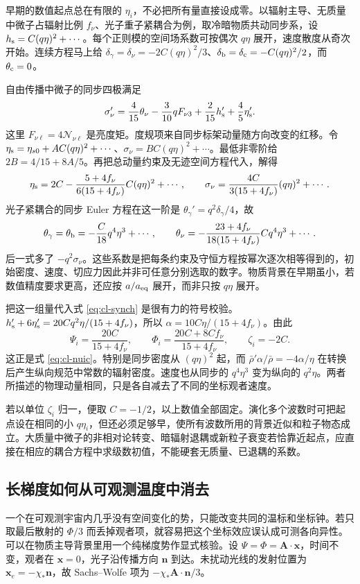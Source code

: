 早期的数值起点总在有限的 $\eta_i$，不必把所有量直接设成零。以辐射主导、无质量中微子占辐射比例 $f_\nu$、光子重子紧耦合为例，取冷暗物质共动同步系，设 $h_{\rm s}=C(q\eta)^2+\cdots$。每个正则模的空间场系数可按偶次 $q\eta$ 展开，速度散度从奇次开始。连续方程马上给 $\delta_\gamma=\delta_\nu=-2C(q\eta)^2/3$、$\delta_{\rm b}=\delta_{\rm c}=-C(q\eta)^2/2$，而 $\theta_{\rm c}=0$。

自由传播中微子的同步四极满足
\[
 \sigma_\nu'=\frac{4}{15}\theta_\nu-\frac{3}{10}q F_{\nu3}
                 +\frac{2}{15}h_{\rm s}'+\frac45\eta_{\rm s}' .
\]
这里 $F_{\nu\ell}=4\mathcal N_{\nu\ell}$ 是亮度矩。度规项来自同步标架动量随方向改变的红移。令 $\eta_{\rm s}=\eta_{s0}+A C(q\eta)^2+\cdots$、$\sigma_\nu=B C(q\eta)^2+\cdots$。最低非零阶给 $2B=4/15+8A/5$。再把总动量约束及无迹空间方程代入，解得
\[
 \eta_{\rm s}=2C-
       \frac{5+4f_\nu}{6(15+4f_\nu)}C(q\eta)^2+\cdots,\qquad
 \sigma_\nu=\frac{4C}{3(15+4f_\nu)}(q\eta)^2+\cdots .
\]
光子紧耦合的同步 Euler 方程在这一阶是 $\theta_\gamma'=q^2\delta_\gamma/4$，故
\[
 \theta_\gamma=\theta_{\rm b}=-\frac{C}{18}q^4\eta^3+\cdots,\qquad
 \theta_\nu=-\frac{23+4f_\nu}{18(15+4f_\nu)}Cq^4\eta^3+\cdots .
\]
后一式多了 $-q^2\sigma_\nu$。这些系数是把每条约束及守恒方程按幂次逐次相等得到的，初始密度、速度、切应力因此并非可任意分别选取的数字。物质背景在早期虽小，若数值精度要求更高，还应按 $a/a_{\rm eq}$ 展开，而非只按 $q\eta$ 展开。

把这一组量代入式 \eqref{eq:cl-synch} 是很有力的符号校验。$h_{\rm s}'+6\eta_{\rm s}'=20Cq^2\eta/(15+4f_\nu)$，所以 $\alpha=10C\eta/(15+4f_\nu)$。由此
\[
 \Psi_i=\frac{20C}{15+4f_\nu},\qquad
 \Phi_i=\frac{20C+8Cf_\nu}{15+4f_\nu},\qquad
 \zeta_i=-2C .
\]
这正是式 \eqref{eq:cl-nuic}。特别是同步密度从 $(q\eta)^2$ 起，而 $\bar\rho'\alpha/\bar\rho=-4\alpha/\eta$ 在转换后产生纵向规范中常数的辐射密度。速度也从同步的 $q^4\eta^3$ 变为纵向的 $q^2\eta$。两者所描述的物理动量相同，只是各自减去了不同的坐标观者速度。

若以单位 $\zeta_i$ 归一，便取 $C=-1/2$，以上数值全部固定。演化多个波数时可把起点设在相同的小 $q\eta_i$，但还必须足够早，使所有波数所用的背景近似和粒子物态成立。大质量中微子的非相对论转变、暗辐射退耦或新粒子衰变若恰靠近起点，应直接在相应的耦合方程中求级数初值，不能硬套无质量、已退耦的系数。

\subsection{长梯度如何从可观测温度中消去}

一个在可观测宇宙内几乎没有空间变化的势，只能改变共同的温标和坐标钟。若只取最后散射的 $\Phi/3$ 而丢掉观者项，就容易把这个坐标效应误认成可测各向异性。可以在物质主导背景里用一个纯梯度势作显式核验。设 $\Psi=\Phi=\bm A\cdot\bm x$，时间不变，观者在 $\bm x=0$，光子沿传播方向 $\bm n$ 到达。未扰动光线的发射位置为 $\bm x_e=-\chi_*\bm n$，故 Sachs--Wolfe 项为 $-\chi_*\bm A\cdot\bm n/3$。


